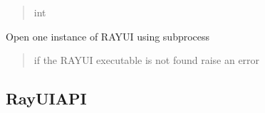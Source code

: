 \documentclass[letterpaper,10pt,english]{sphinxmanual}
\begin{document}
\begin{fulllineitems}
\begin{fulllineitems}
\begin{quote}
\begin{description}
\sphinxAtStartPar
int

\end{description}\end{quote}

\end{fulllineitems}


\begin{fulllineitems}
\label{\detokenize{API:raypyng.runner.RayUIRunner.run}}
\pysigstartsignatures
\pysiglinewithargsret
{}
{}
{}
\pysigstopsignatures
\sphinxAtStartPar
Open one instance of RAY\sphinxhyphen{}UI using subprocess
\begin{quote}\begin{description}
\sphinxAtStartPar
{} \textendash{} if the RAY\sphinxhyphen{}UI executable is not found raise an error

\end{description}\end{quote}

\end{fulllineitems}


\end{fulllineitems}



\subsection{RayUIAPI}
\label{\detokenize{API:rayuiapi}}
\end{document}
